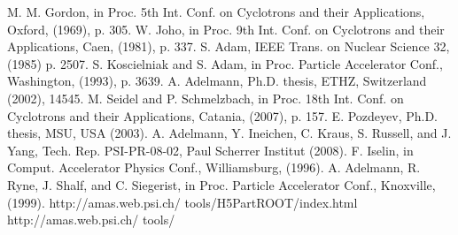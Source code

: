 \documentclass{JAC2003}
\begin{document}
\begin{thebibliography}{99}   %

  M. M. Gordon, in Proc. 5th Int. Conf. on Cyclotrons and their Applications, Oxford, (1969), p. 305.
  W. Joho, in Proc. 9th Int. Conf. on Cyclotrons and their Applications, Caen, (1981), p. 337.
  S. Adam, IEEE Trans. on Nuclear Science 32, (1985) p. 2507.
  S. Koscielniak and S. Adam, in Proc. Particle Accelerator Conf., Washington, (1993), p. 3639.
  A. Adelmann, Ph.D. thesis, ETHZ, Switzerland (2002), 14545.
  M. Seidel and P. Schmelzbach, in Proc. 18th Int. Conf. on Cyclotrons and their Applications, Catania, (2007), p. 157.
  E. Pozdeyev, Ph.D. thesis, MSU, USA (2003).
  A. Adelmann, Y. Ineichen, C. Kraus, S. Russell, and J. Yang, Tech. Rep. PSI-PR-08-02, Paul Scherrer Institut (2008).
  F. Iselin, in Comput. Accelerator Physics Conf., Williamsburg, (1996).
  A. Adelmann, R. Ryne, J. Shalf, and C. Siegerist, in Proc. Particle Accelerator Conf., Knoxville, (1999).
  http://amas.web.psi.ch/ tools/H5PartROOT/index.html
  http://amas.web.psi.ch/ tools/
\end{thebibliography}
\end{document}
